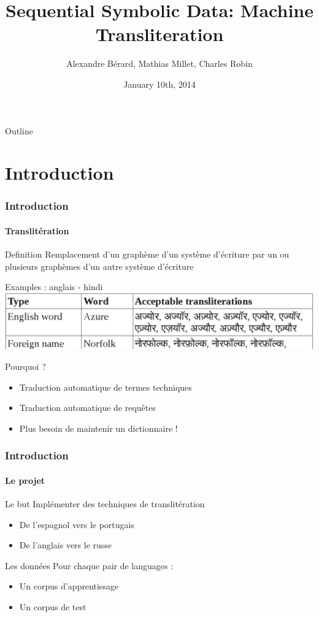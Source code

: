 \documentclass{beamer}
\title[Machine Transliteration]{Sequential Symbolic Data: Machine Transliteration}
\author[A.~Bérard, M.~Millet, C.~Robin]{Alexandre Bérard, Mathias Millet, Charles Robin}
\date{January 10th, 2014}
\begin{document}
\begin{frame}
\titlepage
\end{frame}

\begin{frame}{Outline}
  \tableofcontents
\end{frame}

\section{Introduction}   
 
\begin{frame}
    \frametitle{Introduction}
	\framesubtitle{Translitération}
	\begin{block}{Definition}
	    Remplacement d'un graphème d'un système d'écriture par un ou plusieurs graphèmes d'un autre système d'écriture
    \end{block}	    
    
	\begin{exampleblock}{Examples : anglais - hindi}
	\includegraphics[scale=0.2]{en-in-example}
    \end{exampleblock}
    
	\begin{block}{Pourquoi ?}
	\begin{itemize}
		\item Traduction automatique de termes techniques
		\item Traduction automatique de requ\^etes
		\item Plus besoin de maintenir un dictionnaire !
	\end{itemize}
	\end{block}	    
    
    
\end{frame}

\begin{frame}
\frametitle{Introduction}
\framesubtitle{Le projet}

	\begin{block}{Le but}
		Implémenter des techniques de translitération 
		\begin{itemize}
		\item De l'espagnol vers le portugais
		\item De l'anglais vers le russe
		\end{itemize}
	\end{block}

	\begin{block}{Les données}
	Pour chaque pair de languages :		
		\begin{itemize}
		\item Un corpus d'apprentissage
		\item Un corpus de test
		\end{itemize}		
	\end{block}

\end{frame}
\end{document}

